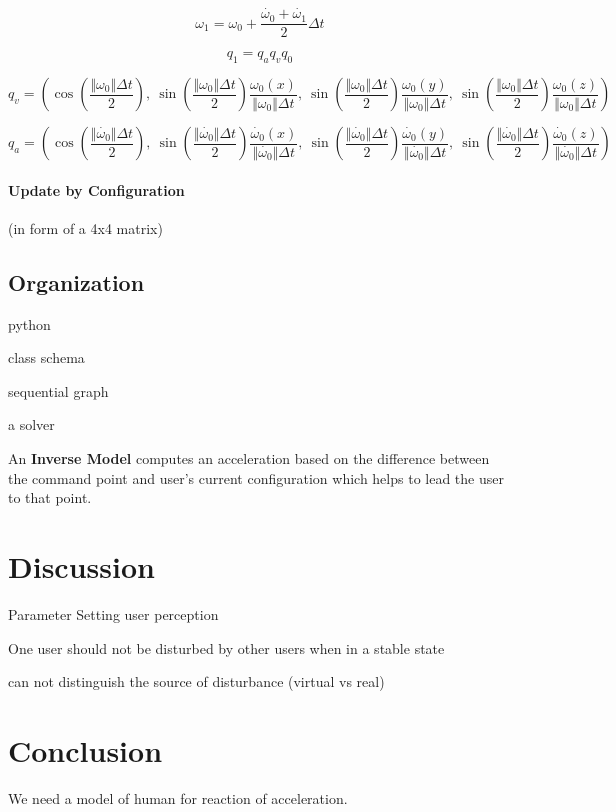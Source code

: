 \[
\omega_{1}=\omega_{0}+\frac{\dot{\omega_{0}}+\dot{\omega_{1}}}{2}\Delta t
\]

\[
q_{1}=q_{a}q_{v}q_{0}
\]

\[
q_{v}=\left(\cos(\frac{\Vert\omega_{0}\Vert\Delta t}{2}),\:\sin(\frac{\Vert\omega_{0}\Vert\Delta t}{2})\frac{\omega_{0}(x)}{\Vert\omega_{0}\Vert\Delta t},\:\sin(\frac{\Vert\omega_{0}\Vert\Delta t}{2})\frac{\omega_{0}(y)}{\Vert\omega_{0}\Vert\Delta t},\:\sin(\frac{\Vert\omega_{0}\Vert\Delta t}{2})\frac{\omega_{0}(z)}{\Vert\omega_{0}\Vert\Delta t}\right)
\]

\[
q_{a}=\left(\cos(\frac{\Vert\dot{\omega_{0}}\Vert\Delta t}{2}),\:\sin(\frac{\Vert\dot{\omega_{0}}\Vert\Delta t}{2})\frac{\dot{\omega_{0}}(x)}{\Vert\dot{\omega_{0}}\Vert\Delta t},\:\sin(\frac{\Vert\dot{\omega_{0}}\Vert\Delta t}{2})\frac{\dot{\omega_{0}}(y)}{\Vert\dot{\omega_{0}}\Vert\Delta t},\:\sin(\frac{\Vert\dot{\omega_{0}}\Vert\Delta t}{2})\frac{\dot{\omega_{0}}(z)}{\Vert\dot{\omega_{0}}\Vert\Delta t}\right)
\]


\paragraph{Update by Configuration}
(in form of a 4x4 matrix)



\subsection{Organization}

python

class schema

sequential graph

a solver

An \textbf{Inverse Model} computes an acceleration based on the difference between the command point and user's current configuration which helps to lead the user to that point.




\section{Discussion}
Parameter Setting user perception

One user should not be disturbed by other users when in a stable state

can not distinguish the source of disturbance (virtual vs real)


\section{Conclusion}
We need a model of human for reaction of acceleration.